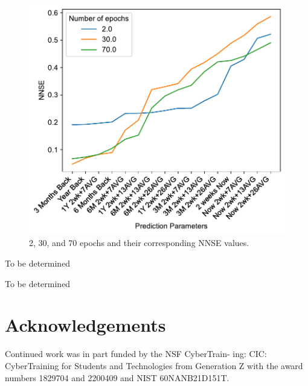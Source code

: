 \documentclass[11pt,twocolumn]{article}
\begin{document}
\begin{figure}[htb]
\includegraphics[width=\columnwidth]{images/NNSE-all-epochs.pdf}
\caption{2, 30, and 70 epochs and their corresponding NNSE values.}
\label{fig:nnse-all-epochs}
\end{figure}


\begin{table}[htb]

\caption{To be determined}
\label{tab:tbd}
\bigskip
\centering%
\end{table}

\begin{table}[htb]

\caption{To be determined}
\label{tab:tbdetermined}
\bigskip
\centering%
\end{table}

\section*{Acknowledgements}

Continued work was in part funded by the NSF CyberTrain-
ing: CIC: CyberTraining for Students and Technologies from
Generation Z with the award numbers 1829704 and 2200409
and NIST 60NANB21D151T.

\clearpage



\end{document}
